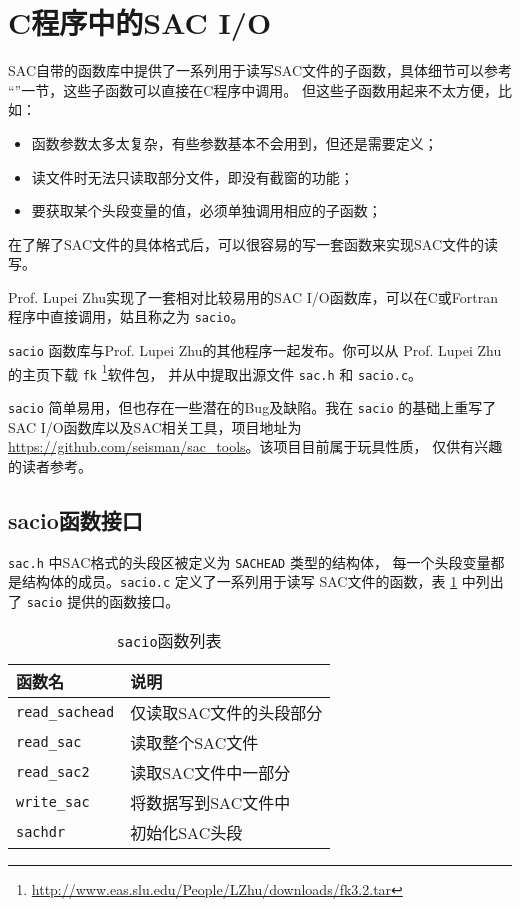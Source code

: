 \section{C程序中的SAC I/O}
SAC自带的函数库中提供了一系列用于读写SAC文件的子函数，具体细节可以参考
``''一节，这些子函数可以直接在C程序中调用。
但这些子函数用起来不太方便，比如：
\begin{itemize}
\item 函数参数太多太复杂，有些参数基本不会用到，但还是需要定义；
\item 读文件时无法只读取部分文件，即没有截窗的功能；
\item 要获取某个头段变量的值，必须单独调用相应的子函数；
\end{itemize}

在了解了SAC文件的具体格式后，可以很容易的写一套函数来实现SAC文件的读写。

Prof. Lupei Zhu实现了一套相对比较易用的SAC I/O函数库，可以在C或Fortran
程序中直接调用，姑且称之为 \texttt{sacio}。

\texttt{sacio} 函数库与Prof. Lupei Zhu的其他程序一起发布。你可以从
Prof. Lupei Zhu的主页下载 \texttt{fk} \footnote{
\url{http://www.eas.slu.edu/People/LZhu/downloads/fk3.2.tar}}软件包，
并从中提取出源文件 \texttt{sac.h} 和 \texttt{sacio.c}。

\texttt{sacio} 简单易用，但也存在一些潜在的Bug及缺陷。我在 \texttt{sacio}
的基础上重写了SAC I/O函数库以及SAC相关工具，项目地址为
\url{https://github.com/seisman/sac_tools}。该项目目前属于玩具性质，
仅供有兴趣的读者参考。

\subsection{sacio函数接口}
\texttt{sac.h} 中SAC格式的头段区被定义为 \texttt{SACHEAD} 类型的结构体，
每一个头段变量都是结构体的成员。\texttt{sacio.c} 定义了一系列用于读写
SAC文件的函数，表 \ref{table:sacio-function} 中列出了 \texttt{sacio}
提供的函数接口。

\begin{table}[H]
\centering
\caption{\texttt{sacio}函数列表}
\label{table:sacio-function}
\begin{tabular}{ll}
\toprule
函数名      &   说明        \\
\midrule
\verb|read_sachead|      &   仅读取SAC文件的头段部分 \\
\verb|read_sac|          &   读取整个SAC文件 \\
\verb|read_sac2|         &   读取SAC文件中一部分 \\
\verb|write_sac|         &   将数据写到SAC文件中 \\
\verb|sachdr|            &   初始化SAC头段\\
\bottomrule
\end{tabular}
\end{table}

